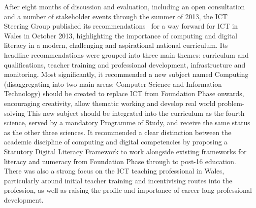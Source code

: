 \documentclass{sig-alternate}
\begin{document}
After eight months of discussion and evaluation, including an open
consultation and a number of stakeholder events through the summer of
2013, the ICT Steering Group published its
recommendations~\cite{welshictreview:2013} for a way forward for ICT
in Wales in October 2013, highlighting the importance of computing and
digital literacy in a modern, challenging and aspirational national
curriculum. Its headline recommendations were grouped into three main
themes: curriculum and qualifications, teacher training and
professional development, infrastructure and monitoring. Most
significantly, it recommended a new subject named Computing
(disaggregating into two main areas: Computer Science and Information
Technology) should be created to replace ICT from Foundation Phase
onwards, encouraging creativity, allow thematic working and develop
real world problem-solving This new subject should be integrated into
the curriculum as the fourth science, served by a mandatory Programme
of Study, and receive the same status as the other three sciences. It
recommended a clear distinction between the academic discipline of
computing and digital competencies by proposing a Statutory Digital
Literacy Framework to work alongside existing frameworks for literacy
and numeracy from Foundation Phase through to post-16 education. There
was also a strong focus on the ICT teaching professional in Wales,
particularly around initial teacher training and incentivising routes
into the profession, as well as raising the profile and importance of
career-long professional development.
\end{document}

